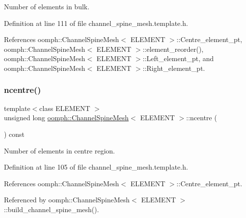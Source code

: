Number of elements in bulk. 



Definition at line 111 of file channel\+\_\+spine\+\_\+mesh.\+template.\+h.



References oomph\+::\+Channel\+Spine\+Mesh$<$ E\+L\+E\+M\+E\+N\+T $>$\+::\+Centre\+\_\+element\+\_\+pt, oomph\+::\+Channel\+Spine\+Mesh$<$ E\+L\+E\+M\+E\+N\+T $>$\+::element\+\_\+reorder(), oomph\+::\+Channel\+Spine\+Mesh$<$ E\+L\+E\+M\+E\+N\+T $>$\+::\+Left\+\_\+element\+\_\+pt, and oomph\+::\+Channel\+Spine\+Mesh$<$ E\+L\+E\+M\+E\+N\+T $>$\+::\+Right\+\_\+element\+\_\+pt.

\mbox{\label{classoomph_1_1ChannelSpineMesh_a422ed0d224b8da3c35732328e1aacdc0}} 
\subsubsection{\texorpdfstring{ncentre()}{ncentre()}}
{\footnotesize\ttfamily template$<$class E\+L\+E\+M\+E\+NT $>$ \\
unsigned long \hyperlink{classoomph_1_1ChannelSpineMesh}{oomph\+::\+Channel\+Spine\+Mesh}$<$ E\+L\+E\+M\+E\+NT $>$\+::ncentre (\begin{DoxyParamCaption}{ }\end{DoxyParamCaption}) const\hspace{0.3cm}{\ttfamily [inline]}}



Number of elements in centre region. 



Definition at line 105 of file channel\+\_\+spine\+\_\+mesh.\+template.\+h.



References oomph\+::\+Channel\+Spine\+Mesh$<$ E\+L\+E\+M\+E\+N\+T $>$\+::\+Centre\+\_\+element\+\_\+pt.



Referenced by oomph\+::\+Channel\+Spine\+Mesh$<$ E\+L\+E\+M\+E\+N\+T $>$\+::build\+\_\+channel\+\_\+spine\+\_\+mesh().

\mbox{\label{classoomph_1_1ChannelSpineMesh_a85fa0910148e6aa5d8a1995ece5feeae}} 
